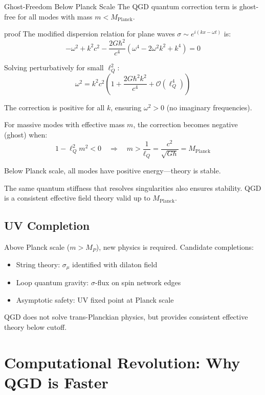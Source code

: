 \documentclass[11pt,a4paper]{article}
\theoremstyle{definition}
\theoremstyle{remark}
\begin{document}
	Ghost-Freedom Below Planck Scale
		The QGD quantum correction term is ghost-free for all modes with mass $m < M_{\text{Planck}}$.
	
	proof
		The modified dispersion relation for plane waves $\sigma \sim e^{i(kx - \omega t)}$ is:
		\begin{equation}
			-\omega^2 + k^2c^2 - \frac{2G\hbar^2}{c^4}(\omega^4 - 2\omega^2k^2 + k^4) = 0
		\end{equation}
		
		Solving perturbatively for small $\ell_Q^2$:
		\begin{equation}
			\omega^2 = k^2c^2\left(1 + \frac{2G\hbar^2k^2}{c^4} + \mathcal{O}(\ell_Q^4)\right)
		\end{equation}
		
		The correction is positive for all $k$, ensuring $\omega^2 > 0$ (no imaginary frequencies).
		
		For massive modes with effective mass $m$, the correction becomes negative (ghost) when:
		\begin{equation}
			1 - \ell_Q^2 m^2 < 0 \quad \Rightarrow \quad m > \frac{1}{\ell_Q} = \frac{c^2}{\sqrt{G\hbar}} = M_{\text{Planck}}
		\end{equation}
		
		Below Planck scale, all modes have positive energy—theory is stable.
	
		The same quantum stiffness that resolves singularities also ensures stability. QGD is a consistent effective field theory valid up to $M_{\text{Planck}}$.
	
	\subsection{UV Completion}
	
	Above Planck scale ($m > M_P$), new physics is required. Candidate completions:
	\begin{itemize}
		\item String theory: $\sigma_\mu$ identified with dilaton field
		\item Loop quantum gravity: $\sigma$-flux on spin network edges
		\item Asymptotic safety: UV fixed point at Planck scale
	\end{itemize}
	
	QGD does not solve trans-Planckian physics, but provides consistent effective theory below cutoff.
	
	\section{Computational Revolution: Why QGD is Faster}
	
\end{document}
